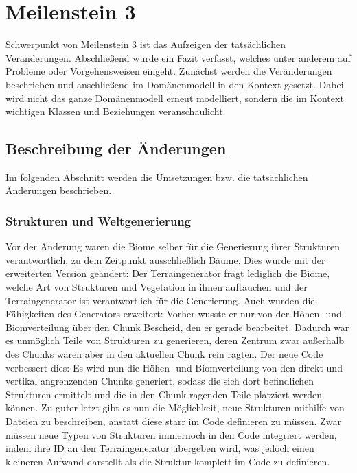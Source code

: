 \documentclass{article}
\begin{document}
\section{Meilenstein 3} \label{sec:ms3}

Schwerpunkt von Meilenstein 3 ist das Aufzeigen der tatsächlichen Veränderungen. Abschließend wurde ein Fazit verfasst, welches unter anderem auf Probleme oder Vorgehensweisen eingeht. Zunächst werden die Veränderungen beschrieben und anschließend im Domänenmodell in den Kontext gesetzt. Dabei wird nicht das ganze Domänenmodell erneut modelliert, sondern die im Kontext wichtigen Klassen und Beziehungen veranschaulicht.

\subsection{Beschreibung der Änderungen}

Im folgenden Abschnitt werden die Umsetzungen bzw. die tatsächlichen Änderungen beschrieben.

\subsubsection{Strukturen und Weltgenerierung}

Vor der Änderung waren die Biome selber für die Generierung ihrer Strukturen verantwortlich, zu dem Zeitpunkt ausschließlich Bäume. Dies wurde mit der erweiterten Version geändert: Der Terraingenerator fragt lediglich die Biome, welche Art von Strukturen und Vegetation in ihnen auftauchen und der Terraingenerator ist verantwortlich für die Generierung. Auch wurden die Fähigkeiten des Generators erweitert: Vorher wusste er nur von der Höhen- und Biomverteilung über den Chunk Bescheid, den er gerade bearbeitet. Dadurch war es unmöglich Teile von Strukturen zu generieren, deren Zentrum zwar außerhalb des Chunks waren aber in den aktuellen Chunk rein ragten. Der neue Code verbessert dies: Es wird nun die Höhen- und Biomverteilung von den direkt und vertikal angrenzenden Chunks generiert, sodass die sich dort befindlichen Strukturen ermittelt und die in den Chunk ragenden Teile platziert werden können. Zu guter letzt gibt es nun die Möglichkeit, neue Strukturen mithilfe von Dateien zu beschreiben, anstatt diese starr im Code definieren zu müssen. Zwar müssen neue Typen von Strukturen immernoch in den Code integriert werden, indem ihre ID an den Terraingenerator übergeben wird, was jedoch einen kleineren Aufwand darstellt als die Struktur komplett im Code zu definieren.
\end{document}

